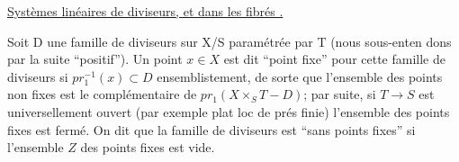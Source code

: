 
   \uline{Systèmes linéaires de diviseurs, et  dans les fibrés .}





















Soit D une famille de diviseurs sur X/S paramétrée par T (nous sous-enten%
dons par la suite ``positif''). Un point $x\in X$ est dit ``point fixe'' pour
cette famille de diviseurs si $pr_1^{-1}(x)\subset D$ ensemblistement, de sorte que l'ensemble des
points non fixes est le complémentaire de $pr_1(X\times_S T - D)$; par suite, si
$T\longrightarrow S$ est universellement ouvert (par exemple plat loc de prés finie)
l'ensemble des points fixes est fermé. On dit que la famille de diviseurs
est ``sans points fixes'' si l'ensemble $Z$ des points fixes est vide.

